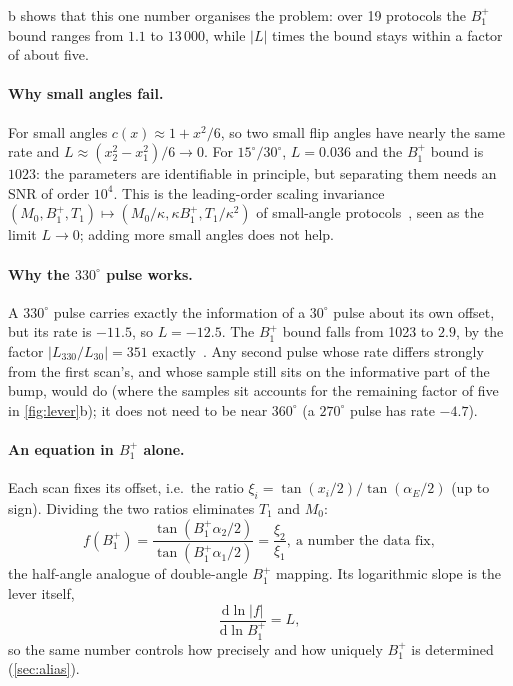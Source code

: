 \documentclass[11pt]{article}
\newcommand{\Bone}{B_1^{+}}
\newcommand{\Tone}{T_1}
\newcommand{\Mzero}{M_0}
\begin{document}
b shows that this one number organises the problem: over 19 protocols the $\Bone$ bound
ranges from $1.1$ to $13\,000$, while $|L|$ times the bound stays within a factor of about five.

\paragraph{Why small angles fail.} For small angles $c(x)\approx1+x^2/6$, so two small flip angles have
nearly the same rate and $L\approx(x_2^2-x_1^2)/6\to0$. For $15^\circ/30^\circ$, $L=0.036$ and the $\Bone$ bound is $1023$: the
parameters are identifiable in principle, but separating them needs an SNR of order $10^4$. This is
the leading-order scaling invariance $(\Mzero,\Bone,\Tone)\mapsto(\Mzero/\kappa,\kappa\Bone,\Tone/\kappa^2)$ of small-angle
protocols~\cite[Prop.~4]{technote}, seen as the limit $L\to0$; adding more small angles does not help.

\paragraph{Why the $330^\circ$ pulse works.} A $330^\circ$ pulse carries exactly the information of a $30^\circ$ pulse
about its own offset, but its rate is $-11.5$, so $L=-12.5$. The $\Bone$ bound falls from 1023 to $2.9$, by
the factor $|L_{330}/L_{30}|=351$ exactly~\cite[Prop.~5, Sec.~4.4]{technote}. Any second pulse whose rate differs
strongly from the first scan's, and whose sample still sits on the informative part of the bump,
would do (where the samples sit accounts for the remaining factor of five in \cref{fig:lever}b); it
does not need to be near $360^\circ$ (a $270^\circ$ pulse has rate $-4.7$).

\paragraph{An equation in $\Bone$ alone.} Each scan fixes its offset, i.e.\ the ratio
$\xi_i=\tan(x_i/2)/\tan(\alpha_E/2)$ (up to sign). Dividing the two ratios eliminates $\Tone$ and $\Mzero$:
\begin{equation}
  f(\Bone)=\frac{\tan(\Bone\alpha_2/2)}{\tan(\Bone\alpha_1/2)}=\frac{\xi_2}{\xi_1},\ \text{a number the data fix},
  \label{eq:f}
\end{equation}
the half-angle analogue of double-angle $\Bone$ mapping. Its logarithmic slope is the lever itself,
\[
  \frac{\mathrm d\ln|f|}{\mathrm d\ln\Bone}=L,
\]
so the same number controls how precisely and how uniquely $\Bone$ is determined (\cref{sec:alias}).
\end{document}
